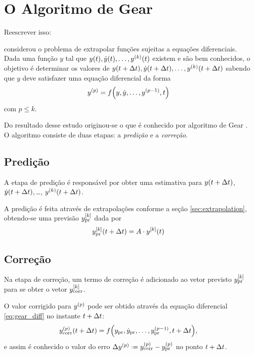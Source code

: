 \section{O Algoritmo de Gear} \label{sec:gear_integration_scheme}

\alert{Reescrever isso:}

 considerou o problema de extrapolar funções sujeitas a equações diferenciais. Dada uma função \(y\) tal que \(y(t), \deriv{1}{y}(t),\dots, \deriv{k}{y}(t)\) existem e são bem conhecidos, o objetivo é determinar os valores de \(y(t + \Dt), \deriv{1}{y}(t + \Dt),\dots, \deriv{k}{y}(t + \Dt)\) sabendo que \(y\) deve satisfazer uma equação diferencial da forma
\begin{equation} \label{eq:gear_diff}
	\deriv{p}{y} = f\pqty{y, \deriv{1}{y},\dots,\deriv{p-1}{y}, t}
\end{equation}
com \(p \leq k\).

Do resultado desse estudo originou-se o que é conhecido por algoritmo de Gear . O algoritmo consiste de duas etapas: a \textit{predição} e a \textit{correção}.

\subsection{Predição}

A etapa de predição é responsável por obter uma estimativa para \(y(t + \Delta t)\), \(\deriv{1}{y}(t + \Dt)\),\,\dots, \(\deriv{k}{y}(t + \Dt)\).

A predição é feita através de extrapolações conforme a seção \ref{sec:extrapolation}, obtendo-se uma previsão \(\drvec{k}{\predicted{y}}\) dada por
\[\drvec{k}{\predicted{y}}\pqty{t+\Dt} = A\cdot\drvec{k}{y}\pqty{t}\]

\subsection{Correção}

Na etapa de correção, um termo de correção é adicionado ao vetor previsto \(\drvec{k}{\predicted{y}}\) para se obter o vetor \(\drvec{k}{\corrected{y}}\).

O valor corrigido para \(\deriv{p}{y}\) pode ser obtido através da equação diferencial \eqref{eq:gear_diff} no instante \(t+\Delta t\):
\[
	\corrected{\deriv{p}{y}}\pqty{t+\Dt} = f\pqty{\predicted{y}, \predicted{\deriv{1}{y}},\dots,\predicted{\deriv{p-1}{y}}, t+\Dt},
\]
e assim é conhecido o valor do erro \(\Delta \deriv{p}{y} \eqdef \corrected{\deriv{p}{y}} - \predicted{\deriv{p}{y}}\) no ponto \(t+\Delta t\).

